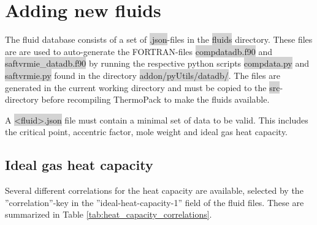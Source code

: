 \documentclass[english]{thermomemo}
\newcommand{\code}[1]{\colorbox{lightgray}{#1}} %
\begin{document}
\section{Adding new fluids}
The fluid database consists of a set of \code{.json}-files in the \code{fluids} directory. These files are are used to auto-generate the FORTRAN-files \code{compdatadb.f90} and \code{saftvrmie\_datadb.f90} by running the respective python scripts \code{compdata.py} and \code{saftvrmie.py} found in the directory \code{addon/pyUtils/datadb/}. The files are generated in the current working directory and must be copied to the \code{src}-directory before recompiling ThermoPack to make the fluids available. 

A \code{<fluid>.json} file must contain a minimal set of data to be valid. This includes the critical point, accentric factor, mole weight and ideal gas heat capacity. 

\subsection{Ideal gas heat capacity}
Several different correlations for the heat capacity are available, selected by the ''correlation''-key in the ''ideal-heat-capacity-1'' field of the fluid files. These are summarized in Table \ref{tab:heat_capacity_correlations}.
\end{document}
